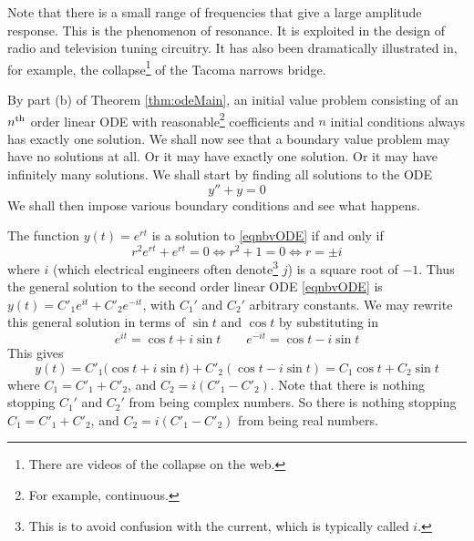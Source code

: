 \begin{eg}
\begin{nfig}
\begin{center}
\end{center}
\end{nfig}
Note that there is a small range of frequencies that give a large
amplitude response. This is the phenomenon of resonance. It is exploited
in the design of radio and television tuning circuitry. It has also been
dramatically illustrated in, for example, the collapse\footnote{There are videos of the collapse on the web.} of the Tacoma narrows bridge. 
\end{eg}

\begin{eg}\label{exBVP}
By part (b) of Theorem \ref{thm:odeMain}, an initial value problem consisting
of an $n^{\rm th}$ order linear ODE with reasonable\footnote{For example, continuous.} coefficients and $n$
initial conditions always has exactly one solution. We shall now see that
a boundary value problem may have no solutions at all. Or it may have exactly
one solution. Or it may have infinitely many solutions. We shall start
by finding all solutions to the ODE
\begin{equation}\label{eqnbvODE}
y''+y=0
\end{equation} 
We shall then impose various boundary conditions and see what happens.

The function $y(t)=e^{rt}$ is a solution to \eqref{eqnbvODE} if and only if
\begin{equation*}
r^2e^{rt}+e^{rt}=0\iff r^2+1=0\iff r=\pm i
\end{equation*}
where $i$ (which electrical engineers often denote\footnote{This is to avoid confusion with the current, which is typically called $i$.}  $j$) is a square root 
of $-1$. Thus the general solution to the second order linear ODE  \eqref{eqnbvODE} 
is $y(t)=C'_1 e^{it}+C'_2e^{-it}$, with $C_1'$ and $C_2'$ arbitrary constants.
We may rewrite this general solution in terms of $\sin t$ and $\cos t$ by 
substituting in
\begin{equation*}
e^{it}=\cos t+i\sin t\qquad
e^{-it}=\cos t-i\sin t
\end{equation*}
This gives
\begin{equation*}
y(t)=C'_1\big(\cos t+i\sin t)+C'_2(\cos t-i\sin t)
=C_1\cos t+C_2\sin t
\end{equation*}
where $C_1=C'_1+C'_2$, and  $C_2=i(C'_1-C'_2)$.
Note that there is nothing stopping $C_1'$ and $C_2'$ from being complex
numbers. So there is nothing stopping $C_1=C'_1+C'_2$, and  
$C_2=i(C'_1-C'_2)$ from being real numbers.


\end{eg}
